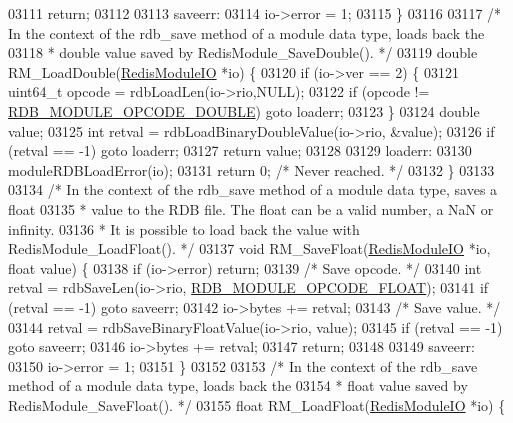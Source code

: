 \begin{DoxyCode}
{{{{{03111     \textcolor{keywordflow}{return};
03112 
03113 saveerr:
03114     io->error = 1;
03115 \}
03116 
03117 \textcolor{comment}{/* In the context of the rdb\_save method of a module data type, loads back the}
03118 \textcolor{comment}{ * double value saved by RedisModule\_SaveDouble(). */}
03119 \textcolor{keywordtype}{double} RM\_LoadDouble(\hyperlink{structRedisModuleIO}{RedisModuleIO} *io) \{
03120     \textcolor{keywordflow}{if} (io->ver == 2) \{
03121         uint64\_t opcode = rdbLoadLen(io->rio,NULL);
03122         \textcolor{keywordflow}{if} (opcode != \hyperlink{rdb_8h_a657fe8be09e7e9b7b4e071da54d2a5f7}{RDB\_MODULE\_OPCODE\_DOUBLE}) \textcolor{keywordflow}{goto} loaderr;
03123     \}
03124     \textcolor{keywordtype}{double} value;
03125     \textcolor{keywordtype}{int} retval = rdbLoadBinaryDoubleValue(io->rio, &value);
03126     \textcolor{keywordflow}{if} (retval == -1) \textcolor{keywordflow}{goto} loaderr;
03127     \textcolor{keywordflow}{return} value;
03128 
03129 loaderr:
03130     moduleRDBLoadError(io);
03131     \textcolor{keywordflow}{return} 0; \textcolor{comment}{/* Never reached. */}
03132 \}
03133 
03134 \textcolor{comment}{/* In the context of the rdb\_save method of a module data type, saves a float}
03135 \textcolor{comment}{ * value to the RDB file. The float can be a valid number, a NaN or infinity.}
03136 \textcolor{comment}{ * It is possible to load back the value with RedisModule\_LoadFloat(). */}
03137 \textcolor{keywordtype}{void} RM\_SaveFloat(\hyperlink{structRedisModuleIO}{RedisModuleIO} *io, \textcolor{keywordtype}{float} value) \{
03138     \textcolor{keywordflow}{if} (io->error) \textcolor{keywordflow}{return};
03139     \textcolor{comment}{/* Save opcode. */}
03140     \textcolor{keywordtype}{int} retval = rdbSaveLen(io->rio, \hyperlink{rdb_8h_ac6c932476609f11914ab1172688f247e}{RDB\_MODULE\_OPCODE\_FLOAT});
03141     \textcolor{keywordflow}{if} (retval == -1) \textcolor{keywordflow}{goto} saveerr;
03142     io->bytes += retval;
03143     \textcolor{comment}{/* Save value. */}
03144     retval = rdbSaveBinaryFloatValue(io->rio, value);
03145     \textcolor{keywordflow}{if} (retval == -1) \textcolor{keywordflow}{goto} saveerr;
03146     io->bytes += retval;
03147     \textcolor{keywordflow}{return};
03148 
03149 saveerr:
03150     io->error = 1;
03151 \}
03152 
03153 \textcolor{comment}{/* In the context of the rdb\_save method of a module data type, loads back the}
03154 \textcolor{comment}{ * float value saved by RedisModule\_SaveFloat(). */}
03155 \textcolor{keywordtype}{float} RM\_LoadFloat(\hyperlink{structRedisModuleIO}{RedisModuleIO} *io) \{
}}}}}
\end{DoxyCode}
